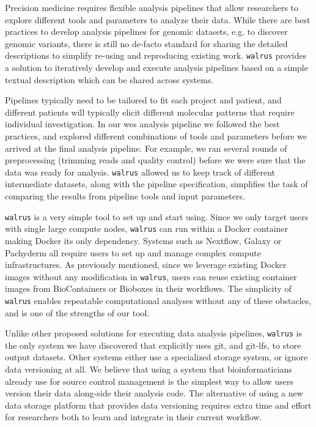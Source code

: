 Precision medicine requires flexible analysis pipelines that allow researchers
to explore different tools and parameters to analyze their data. While there
are best practices to develop analysis pipelines for genomic datasets, e.g. to
discover genomic variants, there is still no de-facto standard for sharing the
detailed descriptions to simplify re-using and reproducing existing work.
\texttt{walrus} provides a solution to iteratively develop and execute
analysis pipelines based on a simple textual description which can be shared
across systems.

Pipelines typically need to be tailored to fit each project and patient, and
different patients will typically elicit different molecular patterns that
require individual investigation.  In our \gls{wes} analysis pipeline we
followed the best practices, and explored different combinations of tools and
parameters before we arrived at the final analysis pipeline. For example, we ran
several rounds of preprocessing (trimming reads and quality control) before we
were sure that the data was ready for analysis. \texttt{walrus} allowed us to
keep track of different intermediate datasets, along with the pipeline
specification, simplifies the task of comparing the results from pipeline tools
and input parameters. 

\texttt{walrus} is a very simple tool to set up and start using. Since we only
target users with single large compute nodes, \texttt{walrus} can run within a
Docker container making Docker its only dependency. Systems such as Nextflow,
Galaxy or Pachyderm all require users to set up and manage complex compute
infrastructures. As previously mentioned, since we leverage existing Docker
images without any modification in \texttt{walrus}, users can reuse
existing container images from BioContainers or Bioboxes in their workflows.
The simplicity of \texttt{walrus} enables repeatable computational analyses
without any of these obstacles, and is one of the strengths of our tool. 

Unlike other proposed solutions for executing data analysis pipelines,
\texttt{walrus} is the only system we have discovered that explicitly uses git,
and git-lfs, to store output datasets. Other systems either use a specialized
storage system, or ignore data versioning at all. We believe that using a system
that bioinformaticians already use for source control management is the simplest
way to allow users version their data along-side their analysis code. The
alternative of using a new data storage platform that provides data versioning
requires extra time and effort for researchers both to learn and integrate in
their current workflow. 

